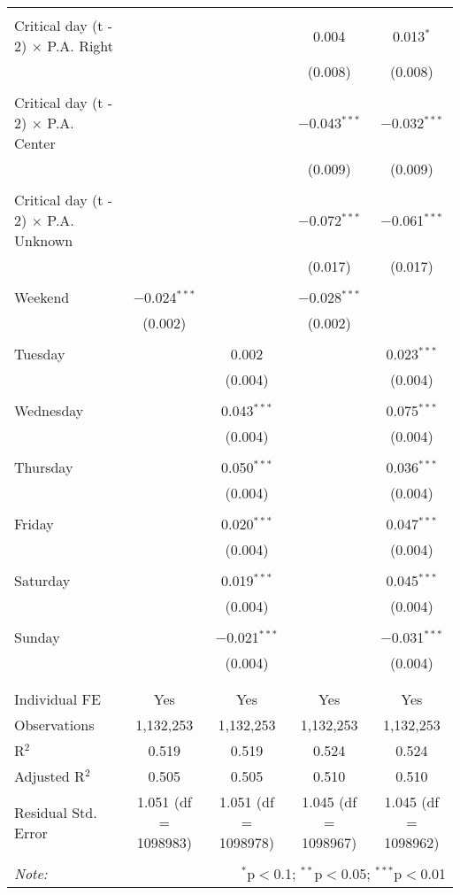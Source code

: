 \documentclass[
]{article}
\begin{document}
\begin{table}[!htbp]
{\begin{tabular}{@{\extracolsep{5pt}}lcccc}
  & & & & \\ 
 Critical day (t - 2) $\times$ P.A. Right &  &  & 0.004 & 0.013$^{*}$ \\ 
  &  &  & (0.008) & (0.008) \\ 
  & & & & \\ 
 Critical day (t - 2) $\times$ P.A. Center &  &  & $-$0.043$^{***}$ & $-$0.032$^{***}$ \\ 
  &  &  & (0.009) & (0.009) \\ 
  & & & & \\ 
 Critical day (t - 2) $\times$ P.A. Unknown &  &  & $-$0.072$^{***}$ & $-$0.061$^{***}$ \\ 
  &  &  & (0.017) & (0.017) \\ 
  & & & & \\ 
 Weekend & $-$0.024$^{***}$ &  & $-$0.028$^{***}$ &  \\ 
  & (0.002) &  & (0.002) &  \\ 
  & & & & \\ 
 Tuesday &  & 0.002 &  & 0.023$^{***}$ \\ 
  &  & (0.004) &  & (0.004) \\ 
  & & & & \\ 
 Wednesday &  & 0.043$^{***}$ &  & 0.075$^{***}$ \\ 
  &  & (0.004) &  & (0.004) \\ 
  & & & & \\ 
 Thursday &  & 0.050$^{***}$ &  & 0.036$^{***}$ \\ 
  &  & (0.004) &  & (0.004) \\ 
  & & & & \\ 
 Friday &  & 0.020$^{***}$ &  & 0.047$^{***}$ \\ 
  &  & (0.004) &  & (0.004) \\ 
  & & & & \\ 
 Saturday &  & 0.019$^{***}$ &  & 0.045$^{***}$ \\ 
  &  & (0.004) &  & (0.004) \\ 
  & & & & \\ 
 Sunday &  & $-$0.021$^{***}$ &  & $-$0.031$^{***}$ \\ 
  &  & (0.004) &  & (0.004) \\ 
  & & & & \\ 
\hline \\[-1.8ex] 
Individual FE & Yes & Yes & Yes & Yes \\ 
Observations & 1,132,253 & 1,132,253 & 1,132,253 & 1,132,253 \\ 
R$^{2}$ & 0.519 & 0.519 & 0.524 & 0.524 \\ 
Adjusted R$^{2}$ & 0.505 & 0.505 & 0.510 & 0.510 \\ 
Residual Std. Error & 1.051 (df = 1098983) & 1.051 (df = 1098978) & 1.045 (df = 1098967) & 1.045 (df = 1098962) \\ 
\hline 
\hline \\[-1.8ex] 
\textit{Note:}  & \multicolumn{4}{r}{$^{*}$p$<$0.1; $^{**}$p$<$0.05; $^{***}$p$<$0.01} \\ 
\end{tabular}
} 
\end{table} 
\newpage
\end{document}

